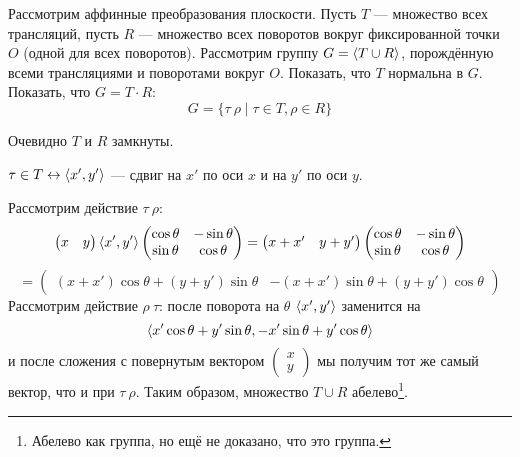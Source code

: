 \begin{exercise}
    Рассмотрим аффинные преобразования плоскости. Пусть \(T\) --- множество всех трансляций, пусть \(R\) --- множество всех поворотов вокруг фиксированной точки \(O\) (одной для всех поворотов). Рассмотрим группу \(G = \ev{T \cup R}\), порождённую всеми трансляциями и поворотами вокруг \(O\). Показать, что \(T\) нормальна в \(G\). Показать, что \(G = T \cdot R\):
    \[G = \{\tau\ \rho \mid \tau \in T, \rho \in R\}\]
\end{exercise}
\begin{solution}
    Очевидно \(T\) и \(R\) замкнуты.

    \begin{notation}
        \(\tau \in T \leftrightarrow \ev{x', y'}\) --- сдвиг на \(x'\) по оси \(x\) и на \(y'\) по оси \(y\).
    \end{notation}

    Рассмотрим действие \(\tau\ \rho\):
    \[\begin{pmatrix}
            x & y
        \end{pmatrix} \ev{x', y'} \begin{pmatrix}
            \cos \theta & - \sin \theta \\
            \sin \theta & \cos \theta
        \end{pmatrix} = \begin{pmatrix}
            x + x' & y + y'
        \end{pmatrix} \begin{pmatrix}
            \cos \theta & - \sin \theta \\
            \sin \theta & \cos \theta
        \end{pmatrix}\]
    \[= \begin{pmatrix}
            (x + x') \cos \theta + (y + y') \sin \theta &
            - (x + x') \sin \theta + (y + y') \cos \theta
        \end{pmatrix}\]
    Рассмотрим действие \(\rho\ \tau\): после поворота на \(\theta\) \(\ev{x', y'}\) заменится на
    \[\ev{x' \cos \theta + y' \sin \theta, - x' \sin \theta + y' \cos \theta}\]
    и после сложения с повернутым вектором \(\begin{pmatrix}
        x \\ y
    \end{pmatrix}\) мы получим тот же самый вектор, что и при \(\tau\ \rho\). Таким образом, множество \(T \cup R\) абелево\footnote{Абелево как группа, но ещё не доказано, что это группа.}.


\end{solution}
